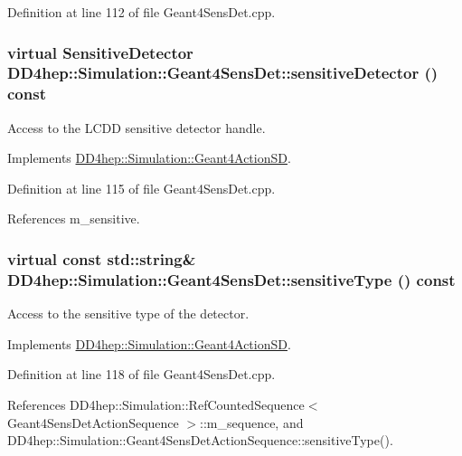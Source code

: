 Definition at line 112 of file Geant4SensDet.cpp.\hypertarget{class_d_d4hep_1_1_simulation_1_1_geant4_sens_det_ad55354b08f476e29a9195be11e4dbe8c}{
\subsubsection[{sensitiveDetector}]{\setlength{\rightskip}{0pt plus 5cm}virtual {\bf SensitiveDetector} DD4hep::Simulation::Geant4SensDet::sensitiveDetector () const}}
\label{class_d_d4hep_1_1_simulation_1_1_geant4_sens_det_ad55354b08f476e29a9195be11e4dbe8c}


Access to the LCDD sensitive detector handle. 

Implements \hyperlink{class_d_d4hep_1_1_simulation_1_1_geant4_action_s_d_a8b1e15e8582895a6a7ad9ce4cf169e8e}{DD4hep::Simulation::Geant4ActionSD}.

Definition at line 115 of file Geant4SensDet.cpp.

References m\_\-sensitive.\hypertarget{class_d_d4hep_1_1_simulation_1_1_geant4_sens_det_a4a615f712c4ec113a536e3b6ffeb3c67}{
\subsubsection[{sensitiveType}]{\setlength{\rightskip}{0pt plus 5cm}virtual const std::string\& DD4hep::Simulation::Geant4SensDet::sensitiveType () const}}
\label{class_d_d4hep_1_1_simulation_1_1_geant4_sens_det_a4a615f712c4ec113a536e3b6ffeb3c67}


Access to the sensitive type of the detector. 

Implements \hyperlink{class_d_d4hep_1_1_simulation_1_1_geant4_action_s_d_ad2aec470fc9632ab3082b51b16a75c00}{DD4hep::Simulation::Geant4ActionSD}.

Definition at line 118 of file Geant4SensDet.cpp.

References DD4hep::Simulation::RefCountedSequence$<$ Geant4SensDetActionSequence $>$::m\_\-sequence, and DD4hep::Simulation::Geant4SensDetActionSequence::sensitiveType().

